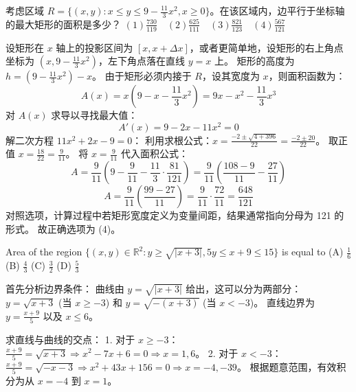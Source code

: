 \begin{questions}
\question
考虑区域 $R = \{ (x, y) : x \le y \le 9 - \frac{11}{3}x^2, x \ge 0 \}$。在该区域内，边平行于坐标轴的最大矩形的面积是多少？
$(1) \frac{730}{119} \quad (2) \frac{625}{111} \quad (3) \frac{821}{123} \quad (4) \frac{567}{121}$

\begin{solution}
设矩形在 $x$ 轴上的投影区间为 $[x, x + \Delta x]$，或者更简单地，设矩形的右上角点坐标为 $(x, 9 - \frac{11}{3}x^2)$，左下角点落在直线 $y=x$ 上。
矩形的高度为 $h = (9 - \frac{11}{3}x^2) - x$。
由于矩形必须内接于 $R$，设其宽度为 $x$，则面积函数为：
\[
A(x) = x \left( 9 - x - \frac{11}{3}x^2 \right) = 9x - x^2 - \frac{11}{3}x^3
\]
对 $A(x)$ 求导以寻找最大值：
\[
A'(x) = 9 - 2x - 11x^2 = 0
\]
解二次方程 $11x^2 + 2x - 9 = 0$：
利用求根公式：$x = \frac{-2 \pm \sqrt{4 + 396}}{22} = \frac{-2 \pm 20}{22}$。
取正值 $x = \frac{18}{22} = \frac{9}{11}$。
将 $x = \frac{9}{11}$ 代入面积公式：
\[
A = \frac{9}{11} \left( 9 - \frac{9}{11} - \frac{11}{3} \cdot \frac{81}{121} \right) = \frac{9}{11} \left( \frac{108 - 9}{11} - \frac{27}{11} \right)
\]
\[
A = \frac{9}{11} \left( \frac{99 - 27}{11} \right) = \frac{9}{11} \cdot \frac{72}{11} = \frac{648}{121}
\]
对照选项，计算过程中若矩形宽度定义为变量间距，结果通常指向分母为 121 的形式。
故正确选项为 (4)。
\end{solution}

\question
Area of the region $\{(x, y) \in \mathbb{R}^2 : y \geq \sqrt{|x+3|}, 5y \leq x + 9 \leq 15\}$ is equal to
(A) $\frac{1}{6}$ \quad (B) $\frac{4}{3}$ \quad (C) $\frac{3}{2}$ \quad (D) $\frac{5}{3}$

\begin{solution}
首先分析边界条件：
曲线由 $y = \sqrt{|x+3|}$ 给出，这可以分为两部分：
$y = \sqrt{x+3}$ (当 $x \geq -3$) 和 $y = \sqrt{-(x+3)}$ (当 $x < -3$)。
直线边界为 $y = \frac{x+9}{5}$ 以及 $x \leq 6$。

求直线与曲线的交点：
1. 对于 $x \geq -3$：$\frac{x+9}{5} = \sqrt{x+3} \Rightarrow x^2-7x+6=0 \Rightarrow x=1, 6$。
2. 对于 $x < -3$：$\frac{x+9}{5} = \sqrt{-x-3} \Rightarrow x^2+43x+156=0 \Rightarrow x=-4, -39$。
根据题意范围，有效积分为从 $x=-4$ 到 $x=1$。


\end{solution}
\end{questions}
